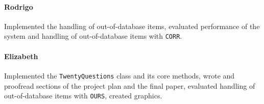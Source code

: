 \documentclass[11pt,a4paper]{article}
\begin{document}
\paragraph{Rodrigo} Implemented the handling of out-of-database items, evaluated performance of the system and handling of out-of-database items with \texttt{CORR}.

\paragraph{Elizabeth} Implemented the \texttt{TwentyQuestions} class and its core methods, wrote and proofread sections of the project plan and the final paper, evaluated handling of out-of-database items with \texttt{OURS}, created graphics.
\end{document}
